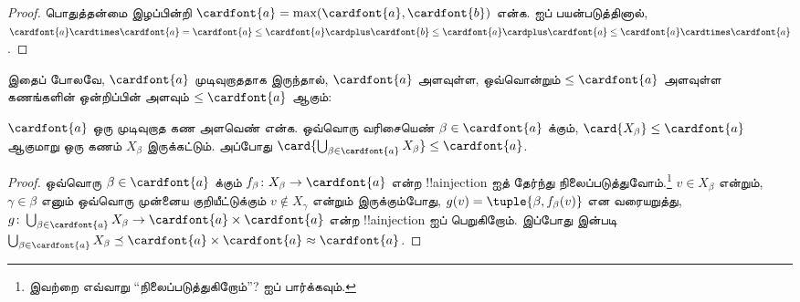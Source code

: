 \documentclass[../../../include/open-logic-section]{subfiles}
\begin{document}
\begin{proof}
பொதுத்தன்மை இழப்பின்றி
$\cardfont{a} = \max(\cardfont{a}, \cardfont{b})$ என்க.
 ஐப் பயன்படுத்தினால்,
$\cardfont{a}\cardtimes\cardfont{a} = \cardfont{a} \leq \cardfont{a}
\cardplus \cardfont{b} \leq \cardfont{a} \cardplus \cardfont{a} \leq
\cardfont{a} \cardtimes \cardfont{a}$.
\end{proof}\noindent
இதைப் போலவே, $\cardfont{a}$ முடிவுறாததாக இருந்தால்,
$\cardfont{a}$ அளவுள்ள, ஒவ்வொன்றும் $\leq\cardfont{a}$ அளவுள்ள
கணங்களின் ஒன்றிப்பின் அளவும் $\leq\cardfont{a}$ ஆகும்:

\begin{prop}
$\cardfont{a}$ ஒரு முடிவுறாத கண அளவெண் என்க.
ஒவ்வொரு வரிசையெண் $\beta \in \cardfont{a}$ க்கும்,
$\card{X_\beta} \leq \cardfont{a}$ ஆகுமாறு ஒரு கணம் $X_\beta$
இருக்கட்டும். அப்போது
$\card{\bigcup_{\beta \in \cardfont{a}} X_\beta}
\leq \cardfont{a}$.
\end{prop}

\begin{proof}
ஒவ்வொரு $\beta \in \cardfont{a}$ க்கும்
$f_\beta \colon X_\beta \to \cardfont{a}$ என்ற
!!a{injection} ஐத் தேர்ந்து நிலைப்படுத்துவோம்.\footnote{இவற்றை
எவ்வாறு ``நிலைப்படுத்துகிறோம்''? 
ஐப் பார்க்கவும்.}
$v \in X_\beta$ என்றும், $\gamma \in \beta$ எனும்
ஒவ்வொரு முன்னைய குறியீட்டுக்கும் $v \notin X_\gamma$ என்றும் இருக்கும்போது,
$g(v) = \tuple{\beta, f_\beta(v)}$ என வரையறுத்து,
$g \colon \bigcup_{\beta \in \cardfont{a}} X_\beta \to
\cardfont{a} \times \cardfont{a}$ என்ற !!a{injection} ஐப்
பெறுகிறோம். இப்போது  இன்படி
$\bigcup_{\beta \in \cardfont{a}} X_\beta \preceq
\cardfont{a} \times \cardfont{a} \approx \cardfont{a}$.
\end{proof}
\end{document}
